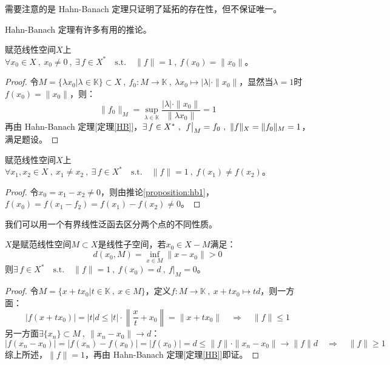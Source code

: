 \begin{remark}
\quad 需要注意的是 Hahn-Banach 定理只证明了延拓的存在性，但不保证唯一。
\end{remark}
Hahn-Banach 定理有许多有用的推论。
\begin{proposition}\label{proposition:hb1}
赋范线性空间$X$上$\forall x_0 \in X \ , \ x_0 \neq 0 \ , \ \exists \, f \in X^* \quad \text{s.t.} \quad \|f\|=1 \ , \ f(x_0)=\|x_0\|$。
\end{proposition}
\begin{proof}
令$M=\{\lambda x_0|\lambda \in \mathbb{K}\} \subset X \ , \ f_0:M \to \mathbb{K} \ , \ \lambda x_0 \mapsto |\lambda|\cdot\|x_0\|$，显然当$\lambda=1$时$f(x_0)=\|x_0\|$，则：
\[\|f_0\|_M=\sup_{\lambda \in \mathbb{K}}\frac{|\lambda|\cdot\|x_0\|}{\|\lambda x_0\|}=1\]
再由 Hahn-Banach 定理[定理\ref{HB}]，$\exists \, f \in X^* \ , \ \eval{f}_{M}=f_0 \ , \ \|f\|_X=\|f_0\|_M=1$，满足题设。
\end{proof}
\begin{proposition}\label{proposition:hb2}
赋范线性空间$X$上$\forall x_1,x_2 \in X \ , \ x_1 \neq x_2 \ , \ \exists \, f \in X^* \quad \text{s.t.} \quad \|f\|=1 \ , \ f(x_1) \neq f(x_2)$。
\end{proposition}
\begin{proof}
令$x_0=x_1-x_2 \neq 0$，则由推论\ref{proposition:hb1}，$f(x_0)=f(x_1-f_2)=f(x_1)-f(x_2) \neq 0$。
\end{proof}
\begin{remark}
\quad 我们可以用一个有界线性泛函去区分两个点的不同性质。
\end{remark}

\begin{proposition}\label{proposition:hb3}
$X$是赋范线性空间$M \subset X$是线性子空间，若$x_0 \in X-M$满足：
\[d(x_0,M)=\inf_{x \in M}\|x-x_0\|>0\]
则$\exists \, f \in X^* \quad \text{s.t.} \quad \|f\|=1 \ , \ f(x_0)=d \ , \ f|_M=0$。
\end{proposition}
\begin{proof}
令$M=\{x+tx_0|t \in \mathbb{K} \ , \ x \in M\}$，定义$f:M \to \mathbb{K} \ , \ x+tx_0 \mapsto td$，则一方面：
\[|f(x+tx_0)|=|t|d \leq |t| \cdot \left\|\frac{x}{t}+x_0\right\|=\|x+tx_0\| \quad \Rightarrow \quad \|f\| \leq 1\]
另一方面$\exists \{x_n\} \subset M \ , \ \|x_n -x_0\| \to d$：
\[|f(x_n-x_0)|=|f(x_n)-f(x_0)|=|f(x_0)|=d \leq \|f\| \cdot \|x_n-x_0\| \to \|f\|d \quad \Rightarrow \quad \|f\| \geq 1\]
综上所述，$\|f\|=1$，再由 Hahn-Banach 定理[定理\ref{HB}]即证。
\end{proof}

